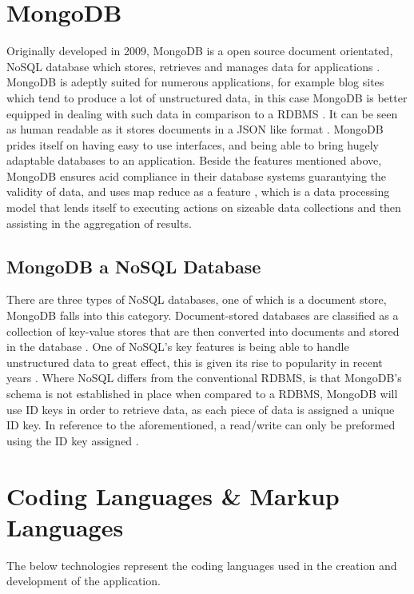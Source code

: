 \section{MongoDB}
Originally developed in 2009, MongoDB is a open source document orientated, NoSQL database which stores, retrieves and manages data for applications \cite{abramova2013nosql}. MongoDB is adeptly suited for numerous applications, for example blog sites which tend to produce a lot of unstructured data, in this case MongoDB is better equipped in dealing with such data in comparison to a RDBMS \cite{agrawal2015survey}. It can be seen as human readable as it stores documents in a JSON like format \cite{calccada2019evaluation}. MongoDB prides itself on having easy to use interfaces, and being able to bring hugely adaptable databases to an application. Beside the features mentioned above, MongoDB ensures acid compliance in their database systems guarantying the validity of data, and uses map reduce as a feature \cite{agrawal2015survey}, which is a data processing model that lends itself to executing actions on sizeable data collections and then assisting in the aggregation of results.

\subsection{MongoDB a NoSQL Database}
There are three types of NoSQL databases, one of which is a document store, MongoDB falls into this category. Document-stored databases are classified as a collection of key-value stores that are then converted into documents and stored in the database \cite{calccada2019evaluation}. One of NoSQL's key features is being able to handle unstructured data to great effect, this is given its rise to popularity in recent years \cite{agrawal2015survey}. Where NoSQL differs from the conventional RDBMS, is that MongoDB's schema is not established in place when compared to a RDBMS, MongoDB will use ID keys in order to retrieve data, as each piece of data is assigned a unique ID key. In reference to the aforementioned, a read/write can only be preformed using the ID key assigned \cite{gyHorodi2015comparative}.

\section{Coding Languages \& Markup Languages}
The below technologies represent the coding languages used in the creation and development of the application.

